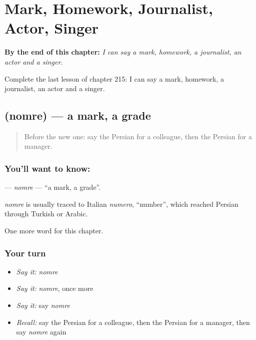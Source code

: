 
\chapter{Mark, Homework, Journalist, Actor, Singer}
\label{ch:fa-mark-homework-journalist-actor-singer}

\begin{chapteropening}
\textbf{By the end of this chapter:} \emph{I can say a mark, homework, a journalist, an actor and a singer.}

Complete the last lesson of chapter 215: I can say a mark, homework, a journalist, an actor and a singer.
\end{chapteropening}

\section[\texorpdfstring{\fa{نمره} (nomre)}{نمره (nomre)}]{ (nomre) — a mark, a grade}

\label{lesson:FA-C215-nomre}



\begin{quote}
Before the new one: say the Persian for a colleague, then the Persian for a manager.
\end{quote}

\subsection*{You'll want to know: }
\textbf{} — \emph{nomre} — \textquotedblleft{}a mark, a grade\textquotedblright{}.

\begin{cousinweb}
\emph{nomre} is usually traced to Italian \emph{numero}, \textquotedblleft{}number\textquotedblright{}, which reached Persian through Turkish or Arabic.
\end{cousinweb}

\begin{grammarlens}[title={What you've built}]
One more word for this chapter.
\end{grammarlens}

\subsection*{Your turn}
\begin{itemize}
\raggedright
  \item \emph{Say it:} \emph{nomre}
  \item \emph{Say it:} \emph{nomre}, once more
  \item \emph{Say it:} say \emph{nomre}
  \item \emph{Recall:} say the Persian for a colleague, then the Persian for a manager, then say \emph{nomre} again
\end{itemize}

